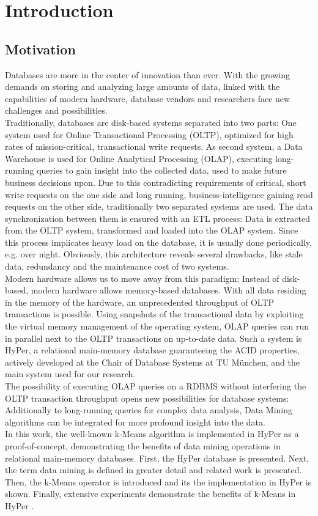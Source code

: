 \chapter{Introduction}\label{chapter:introduction}

\section{Motivation}


Databases are more in the center of innovation than ever. With the growing demands on storing and analyzing large amounts of data, linked with the capabilities of modern hardware, database vendors and researchers face new challenges and possibilities. 
\\
Traditionally, databases are disk-based systems separated into two parts: One system used for Online Transactional Processing (OLTP), optimized for high rates of mission-critical, transactional write requests. As second system, a Data Warehouse is used for Online Analytical Processing (OLAP), executing long-running queries to gain insight into the  collected data, used to make future business decisions upon. Due to this contradicting requirements of critical, short write requests on the one side and long running, business-intelligence gaining read requests on the other side, traditionally two separated systems are used. The data synchronization between them is ensured with an ETL process: Data is extracted from the OLTP system, transformed and loaded into the OLAP system. Since this process implicates heavy load on the database, it is usually done periodically, e.g. over night. Obviously, this architecture reveals several drawbacks, like stale data, redundancy and the maintenance cost of two systems.
\\
Modern hardware allows us to move away from this paradigm: Instead of disk-based, modern hardware allows memory-based databases. With all data residing in the memory of the hardware, an unprecedented throughput of OLTP transactions is possible. Using snapshots of the transactional data by exploiting the virtual memory management of the operating system, OLAP queries can run in parallel next to the OLTP transactions on up-to-date data. Such a system is HyPer, a relational main-memory database guaranteeing the ACID properties, actively developed at the Chair of Database Systems at TU München, and the main system used for our research. 
\\
The possibility of executing OLAP queries on a RDBMS without interfering the OLTP transaction throughput opens new possibilities for database systems: Additionally to long-running queries for complex data analysis, Data Mining algorithms can be integrated for more profound insight into the data. 
\\
In this work, the well-known k-Means algorithm is implemented in HyPer as a proof-of-concept, demonstrating the benefits of data mining operations in relational main-memory databases. First, the HyPer database is presented. Next, the term data mining is defined in greater detail and related work is presented. Then, the k-Means operator is introduced and its the implementation in HyPer is shown. Finally, extensive experiments demonstrate the benefits of k-Means in HyPer .


